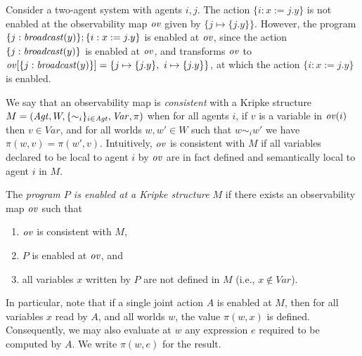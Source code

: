 \documentclass[]{llncs}
\newcommand{\be}{\begin{enumerate}}
\newcommand{\ee}{\end{enumerate}}
\newcommand{\broadcast}{{\it broadcast}}
\newcommand{\omap}{{\it ov}}
\newcommand{\Agt}{{\it Agt}}
\newcommand{\Var}{{\it Var}}
\begin{document}
\begin{example} 
Consider a two-agent system with agents $i,j$. 
The action $\{i: x:= j.y\}$ is not enabled at the observability map $\omap$ 
given by $\{j \mapsto \{j.y\}\}$. However, the 
program $\{j:\broadcast(y)\}; \{i: x:= j.y\}$ is enabled at $\omap$, 
since  the action $\{j:\broadcast(y)\}$ is enabled at $\omap$, and 
transforms $\omap$ to  $\omap[\{j:\broadcast(y)\}] = \{j \mapsto \{j.y\}, ~i\mapsto  \{j.y\}\}$,
at  which the action $\{i: x:= j.y\}$ is enabled. 
\end{example} 

We say that an  observability map is {\em  consistent} with a Kripke  structure
$M = (\Agt, W, \{\sim_i\}_{i\in \Agt}, \Var, \pi)$
when for all agents $i$, if $v$ is a variable in $\omap(i)$ then $v\in Var$, and for 
 all worlds $w,w'\in W$ such that $w\sim_i w'$
we have $\pi(w,v) = \pi(w',v)$. Intuitively, $\omap$ is consistent with $M$  if all 
variables declared to be local to agent $i$ by $\omap$ are in fact defined and  semantically 
local  to agent $i$ in $M$.

The {\em program $P$ is enabled at a Kripke structure $M$} if 
there exists an observability map $\omap$ such that
\be 
\item $\omap$  is consistent with $M$, 
\item $P$ is enabled at $\omap$, and 
\item all variables  $x$ written by $P$ are not defined in $M$ (i.e., $x\not \in Var$). 
\ee 
In particular, note that if a single joint action $A$ is enabled at $M$, then 
for all variables $x$ read by $A$, and all worlds $w$, the value $\pi(w,x)$ is
defined. Consequently, we may also evaluate at $w$ any expression $e$ 
required to be computed  by $A$. We write $\pi(w,e)$ for the result. 
\end{document}
